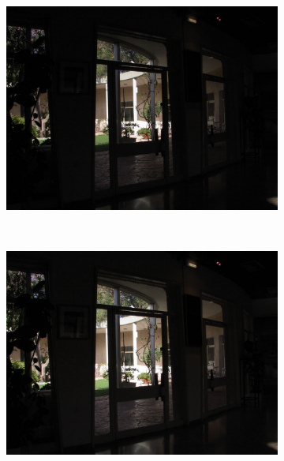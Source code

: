 \begin{figure}
\begin{subfigure}[b]{0.33\textwidth}
    \includegraphics[width=\textwidth]{figures/chapter2/exposure/bh3.jpg}
\end{subfigure}\\
\begin{subfigure}[b]{0.33\textwidth}
   \centering
    \includegraphics[width=\textwidth]{figures/chapter2/exposure/bh4.jpg}
\end{subfigure}\hfill
\begin{subfigure}[b]{0.33\textwidth}
    \centering

\end{subfigure}
\end{figure}
